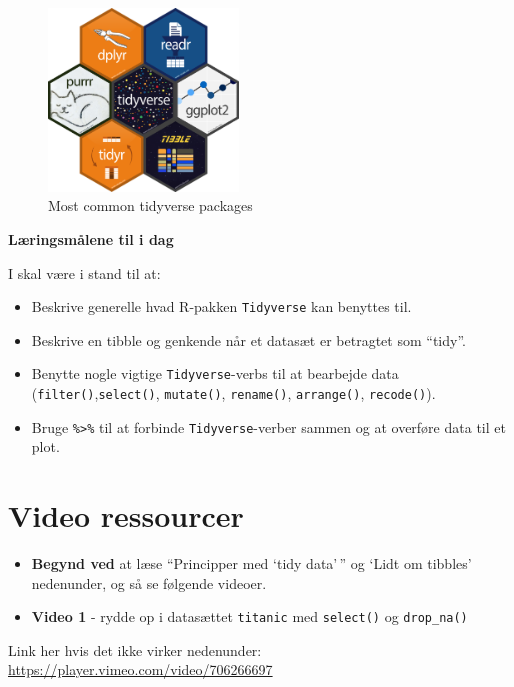 \documentclass[
]{book}
\providecommand{\tightlist}{%
  \setlength{\itemsep}{0pt}\setlength{\parskip}{0pt}}
\begin{document}
\begin{figure}
\centering
\includegraphics[width=0.45\textwidth,height=\textheight]{plots/tidyverse2_packages.png}
\caption{Most common tidyverse packages}
\end{figure}

\textbf{Læringsmålene til i dag}

I skal være i stand til at:

\begin{itemize}
\tightlist
\item
  Beskrive generelle hvad R-pakken \texttt{Tidyverse} kan benyttes til.
\item
  Beskrive en tibble og genkende når et datasæt er betragtet som ``tidy''.
\item
  Benytte nogle vigtige \texttt{Tidyverse}-verbs til at bearbejde data (\texttt{filter()},\texttt{select()}, \texttt{mutate()}, \texttt{rename()}, \texttt{arrange()}, \texttt{recode()}).
\item
  Bruge \texttt{\%\textgreater{}\%} til at forbinde \texttt{Tidyverse}-verber sammen og at overføre data til et plot.
\end{itemize}

\hypertarget{video-ressourcer-2}{%
\section{Video ressourcer}\label{video-ressourcer-2}}

\begin{itemize}
\item
  \textbf{Begynd ved} at læse ``Principper med `tidy data'\,'' og `Lidt om tibbles' nedenunder, og så se følgende videoer.
\item
  \textbf{Video 1} - rydde op i datasættet \texttt{titanic} med \texttt{select()} og \texttt{drop\_na()}
\end{itemize}

Link her hvis det ikke virker nedenunder: \url{https://player.vimeo.com/video/706266697}
\end{document}

